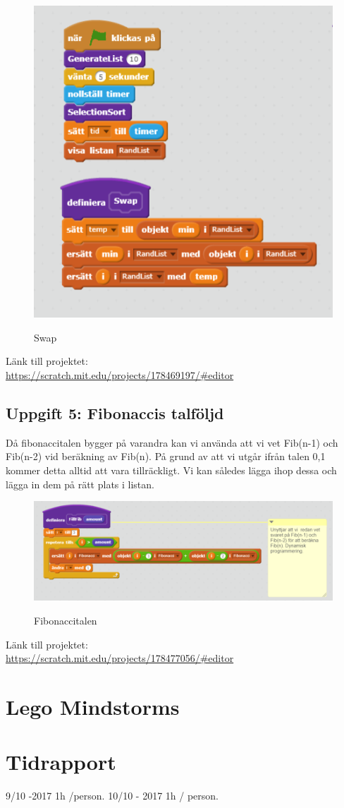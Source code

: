 \documentclass[12pt,a4paper]{article}
\begin{document}
\begin{figure}[H]
	\caption{Swap}
	\centering
	\includegraphics[scale=0.8]{swap}
	\label{fig5:swap}
\end{figure}
Länk till projektet:  \\
 \url{https://scratch.mit.edu/projects/178469197/#editor }
\subsection{Uppgift 5: Fibonaccis talföljd}
Då fibonaccitalen bygger på varandra kan vi använda att vi vet Fib(n-1) och Fib(n-2) vid beräkning av Fib(n). På grund av att vi utgår ifrån talen 0,1 kommer detta alltid att vara tillräckligt. Vi kan således lägga ihop dessa och lägga in dem på rätt plats i listan.
\begin{figure}[H]
	\caption{Fibonaccitalen}
	\centering
	\includegraphics[scale=0.8]{fib}
	\label{fig6:fib}
\end{figure}
Länk till projektet:  \\
 \url{https://scratch.mit.edu/projects/178477056/#editor }
\section{Lego Mindstorms}
\section{Tidrapport}
9/10 -2017 1h /person. 
10/10 - 2017 1h / person. 
\end{document}
